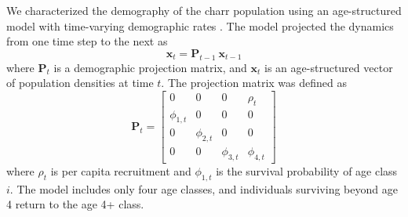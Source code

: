 \documentclass[11pt]{article}
\begin{document}
We characterized the demography of the charr population 
using an age-structured model \citep{caswell2001matrix}
with time-varying demographic rates 
\citep{zeng1998, ives2012detecting, nielsen2014estimation}.
The model projected the dynamics from one time step to the next as
%
\begin{equation} \label{eq:XPX}
    \mathbf{x}_t = \mathbf{P}_{t-1}~\mathbf{x}_{t-1}
\end{equation}
%
where $\mathbf{P}_{t}$ is a demographic projection matrix,
and $\mathbf{x}_t$ is an age-structured vector of population densities at time $t$.
%
The projection matrix was defined as
%
\begin{equation} \label{eq:matrix}
\mathbf{P}_{t} = 
\left[
\begin{array}{cccccccc}
    0             & 0             & 0             & \rho_{t}     \\
    \phi_{1,t}    & 0             & 0             & 0            \\
    0             & \phi_{2,t}    & 0             & 0            \\
    0             & 0             & \phi_{3,t}    & \phi_{4,t}
    \end{array}
\right]
\end{equation}
%
where $\rho_{t}$ is per capita recruitment 
and $\phi_{1,t}$ is the survival probability of age class $i$. 
The model includes only four age classes,
and individuals surviving beyond age 4 return to the age 4+ class.
\end{document}
